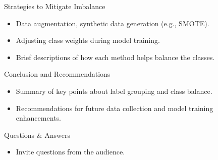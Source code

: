 \documentclass{beamer}
\begin{document}
\begin{frame}{Strategies to Mitigate Imbalance}
  \begin{itemize}
    \item Data augmentation, synthetic data generation (e.g., SMOTE).
    \item Adjusting class weights during model training.
    \item Brief descriptions of how each method helps balance the classes.
  \end{itemize}
\end{frame}

\begin{frame}{Conclusion and Recommendations}
  \begin{itemize}
    \item Summary of key points about label grouping and class balance.
    \item Recommendations for future data collection and model training enhancements.
  \end{itemize}
\end{frame}

\begin{frame}{Questions \& Answers}
  \begin{itemize}
    \item Invite questions from the audience.
  \end{itemize}
\end{frame}
\end{document}
